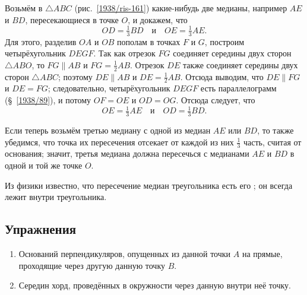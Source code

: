 \documentclass[oneside]{book}
\begin{document}
Возьмём в $\triangle ABC$ (рис.~\ref{1938/ris-161}) какие-нибудь две медианы, например $AE$ и $BD$, пересекающиеся в точке $O$, и докажем, что
\[OD=\tfrac13 BD\quad\text{и}\quad OE = \tfrac13 AE.\]
Для этого, разделив $OA$ и $OB$ пополам в точках $F$ и $G$, построим четырёхугольник $DEGF$.
Так как отрезок $FG$ соединяет середины двух сторон $\triangle ABO$, то $FG\parallel AB$ и $FG=\tfrac12 AB$.
Отрезок $DE$ также соединяет середины двух сторон $\triangle ABC$;
поэтому $DE\parallel AB$ и $DE=\tfrac12 AB$.
Отсюда выводим, что $DE \parallel FG$ и $DE=FG$;
следовательно, четырёхугольник $DEGF$ есть параллелограмм (§~\ref{1938/89}), и потому $OF=OE$ и $OD=OG$.
Отсюда следует, что
\[ OE=\tfrac13AE\quad\text{и}\quad OD=\tfrac13 BD.\]

Если теперь возьмём третью медиану с одной из медиан $AE$ или $BD$, то также убедимся, что точка их пересечения отсекает от каждой из них $\tfrac13$ часть, считая от основания;
значит, третья медиана должна пересечься с медианами $AE$ и $BD$ в одной и той же точке $O$.

Из физики известно, что пересечение медиан треугольника есть его ;
он всегда лежит внутри треугольника.


\subsection*{Упражнения}

\begin{center}
\end{center}

\begin{enumerate}


 \item
Оснований перпендикуляров, опущенных из данной точки $A$ на прямые, проходящие через другую данную точку $B$.

 \item
Середин хорд, проведённых в окружности через данную внутри неё точку.

\end{enumerate}

\end{document}
